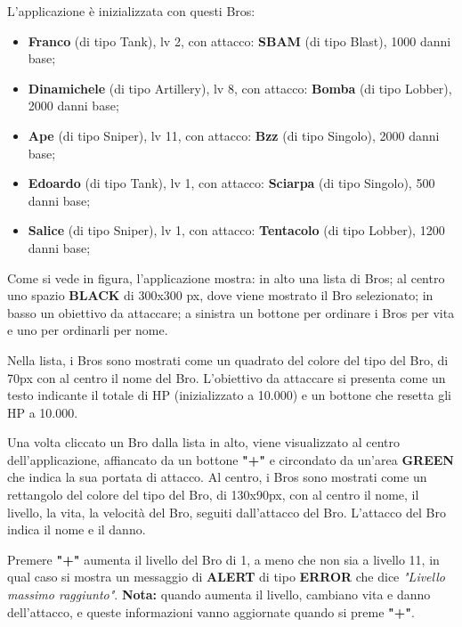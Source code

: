 \documentclass{article}
\begin{document}
\vspace{0.4cm}
\noindent
L'applicazione è inizializzata con questi Bros:
\begin{itemize}
    \item \textbf{Franco} (di tipo Tank), lv 2, con attacco: \textbf{SBAM} (di tipo Blast), 1000 danni base;
    \item \textbf{Dinamichele} (di tipo Artillery), lv 8, con attacco: \textbf{Bomba} (di tipo Lobber), 2000 danni base;
    \item \textbf{Ape} (di tipo Sniper), lv 11, con attacco: \textbf{Bzz} (di tipo Singolo), 2000 danni base;
    \item \textbf{Edoardo} (di tipo Tank), lv 1, con attacco: \textbf{Sciarpa} (di tipo Singolo), 500 danni base;
    \item \textbf{Salice} (di tipo Sniper), lv 1, con attacco: \textbf{Tentacolo} (di tipo Lobber), 1200 danni base;
\end{itemize}

\newpage

\noindent
Come si vede in figura, l'applicazione mostra: in alto una lista di Bros; al centro uno spazio \textbf{BLACK} di 300x300 px, dove viene mostrato il Bro selezionato; in basso un obiettivo da attaccare; a sinistra un bottone per ordinare i Bros per vita e uno per ordinarli per nome. 

\noindent
Nella lista, i Bros sono mostrati come un quadrato del colore del tipo del Bro, di 70px con al centro il nome del Bro. L'obiettivo da attaccare si presenta come un testo indicante il totale di HP (inizializzato a 10.000) e un bottone che resetta gli HP a 10.000.

\vspace{0.3cm}
\noindent
Una volta cliccato un Bro dalla lista in alto, viene visualizzato al centro dell'applicazione, affiancato da un bottone \textbf{"+"} e circondato da un'area \textbf{GREEN} che indica la sua portata di attacco. Al centro, i Bros sono mostrati come un rettangolo del colore del tipo del Bro, di 130x90px, con al centro il nome, il livello, la vita, la velocità del Bro, seguiti dall'attacco del Bro. L'attacco del Bro indica il nome e il danno.

\vspace{0.3cm}
\noindent
Premere \textbf{"+"} aumenta il livello del Bro di 1, a meno che non sia a livello 11, in qual caso si mostra un messaggio di \textbf{ALERT} di tipo \textbf{ERROR} che dice \textit{"Livello massimo raggiunto"}. \textbf{Nota:} quando aumenta il livello, cambiano vita e danno dell'attacco, e queste informazioni vanno aggiornate quando si preme \textbf{"+"}.
\end{document}

